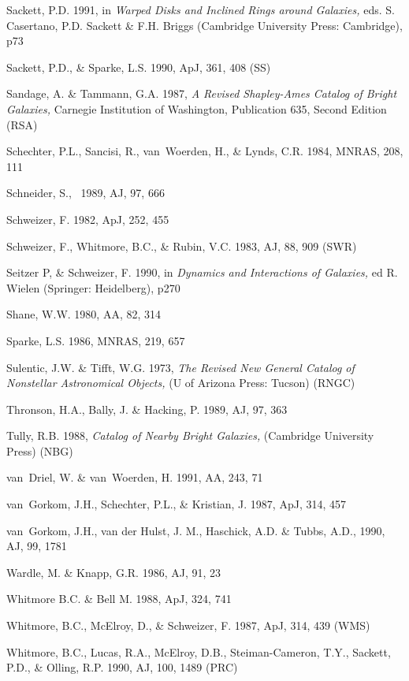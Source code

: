 \bibitem
Sackett, P.D. 1991, 
in {\it Warped Disks and Inclined Rings around Galaxies,\/} 
eds. S. Casertano, P.D. Sackett \& F.H. Briggs 
(Cambridge University Press: Cambridge), p73

\bibitem
Sackett, P.D., \& Sparke, L.S. 1990, ApJ, 361, 408 (SS) 

\bibitem
Sandage, A. \& Tammann, G.A. 1987, {\it A Revised Shapley-Ames Catalog of 
Bright Galaxies,\/} Carnegie Institution of Washington, Publication 635, 
Second Edition (RSA) 

\bibitem
Schechter, P.L., Sancisi, R., van~Woerden, H., \& Lynds, C.R. 1984,
MNRAS, 208, 111 

\bibitem 
Schneider, S., \etal\ 1989, AJ, 97, 666

\bibitem
Schweizer, F. 1982, ApJ, 252, 455

\bibitem
Schweizer, F., Whitmore, B.C., \& Rubin, V.C. 1983, AJ, 88, 909 (SWR) 

\bibitem
Seitzer P, \& Schweizer, F. 1990, in {\it Dynamics and Interactions of 
Galaxies,\/} ed R. Wielen (Springer: Heidelberg), p270 

\bibitem
Shane, W.W. 1980, AA, 82, 314 

\bibitem
Sparke, L.S. 1986, MNRAS, 219, 657 

\bibitem
Sulentic, J.W. \& Tifft, W.G. 1973, {\it The Revised New General Catalog of
Nonstellar Astronomical Objects,\/} (U of Arizona Press: Tucson) (RNGC)

\bibitem
Thronson, H.A., Bally, J. \& Hacking, P. 1989, AJ, 97, 363

\bibitem
Tully, R.B. 1988, {\it Catalog of Nearby Bright Galaxies,\/} (Cambridge 
University Press) (NBG)

\bibitem
van~Driel, W. \& van~Woerden, H. 1991, AA, 243, 71

\bibitem
van~Gorkom, J.H., Schechter, P.L., \& Kristian, J. 1987, ApJ, 314, 457 

\bibitem
van~Gorkom, J.H., van der Hulst, J. M., Haschick, A.D. \& Tubbs, A.D., 
1990, AJ, 99, 1781   %

\bibitem
Wardle, M. \& Knapp, G.R. 1986, AJ, 91, 23

\bibitem
Whitmore B.C. \& Bell M. 1988, ApJ, 324, 741

\bibitem
Whitmore, B.C., McElroy, D., \& Schweizer, F. 1987, ApJ, 314, 439 (WMS) 

\bibitem
Whitmore, B.C., Lucas, R.A., McElroy, D.B., Steiman-Cameron, T.Y.,
Sackett, P.D., \& Olling, R.P. 1990, AJ, 100, 1489 (PRC) 

